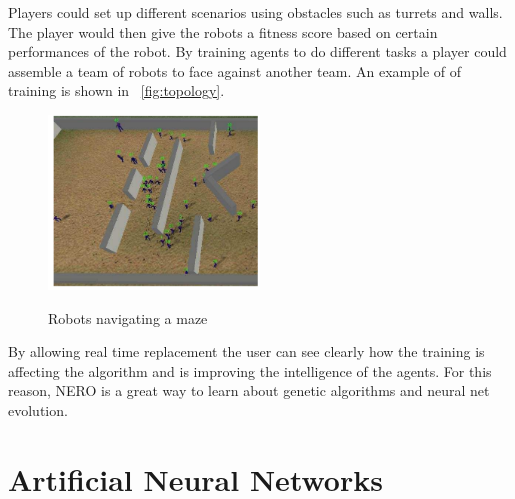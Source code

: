 \documentclass[12pt]{ucthesis} \newif\ifpdf \ifx\pdfoutput\undefined
\begin{document}
Players could set up different scenarios using obstacles such as turrets and
walls. The player would then give the robots a fitness score based on certain
performances of the robot. By training agents to do different tasks a player
could assemble a team of robots to face against another team. An example of of
training is shown in ~\ref{fig:topology}.

\begin{figure}[h!] 
\caption{Robots navigating a maze}
  \centering
    \includegraphics[width=0.5\textwidth]{robot.png}
   \label{fig:robot} 
\end{figure}

By allowing real time replacement the user can see clearly how the training is
affecting the algorithm and is improving the intelligence of the agents. For
this reason, NERO is a great way to learn about genetic algorithms and neural
net evolution.

\section{Artiﬁcial Neural Networks}
\end{document}
